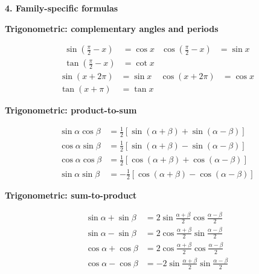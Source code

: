 \documentclass[10pt,a4paper]{article}
\newcommand{\sectionbar}[1]{%
  \needspace{3\baselineskip}
  \vspace{4pt}%
  \colorbox{DeepBlue}{%
    \parbox{\dimexpr\linewidth-2\fboxsep\relax}{%
      \color{white}\bfseries #1}}%
  \vspace{3pt}%
}
\newcommand{\subbar}[1]{%
  \needspace{3\baselineskip}
  \vspace{3pt}%
  {\color{Teal}\bfseries #1}\par
  \vspace{-1pt}{\color{RuleBlue}\rule{\linewidth}{0.45pt}}\vspace{-3pt}%
}
\begin{document}
\newpage
\sectionbar{4. Family-specific formulas}
\noindent
\begin{minipage}[t][0.86\textheight][t]{0.485\linewidth}
\vspace{0pt}

\subbar{Trigonometric: complementary angles and periods}
\[
\begin{aligned}
\sin\!\left(\frac\pi2-x\right)&=\cos x &
\cos\!\left(\frac\pi2-x\right)&=\sin x\\
\tan\!\left(\frac\pi2-x\right)&=\cot x
\end{aligned}
\]
\[
\begin{aligned}
\sin(x+2\pi)&=\sin x & \cos(x+2\pi)&=\cos x\\
\tan(x+\pi)&=\tan x
\end{aligned}
\]

\vfill
\subbar{Trigonometric: product-to-sum}
\footnotesize
\[
\begin{aligned}
\sin\alpha\cos\beta
 &=\tfrac12[\sin(\alpha+\beta)+\sin(\alpha-\beta)]\\
\cos\alpha\sin\beta
 &=\tfrac12[\sin(\alpha+\beta)-\sin(\alpha-\beta)]\\
\cos\alpha\cos\beta
 &=\tfrac12[\cos(\alpha+\beta)+\cos(\alpha-\beta)]\\
\sin\alpha\sin\beta
 &=-\tfrac12[\cos(\alpha+\beta)-\cos(\alpha-\beta)]
\end{aligned}
\]
\normalsize

\vfill
\subbar{Trigonometric: sum-to-product}
\footnotesize
\[
\begin{aligned}
\sin\alpha+\sin\beta
 &=2\sin\frac{\alpha+\beta}{2}\cos\frac{\alpha-\beta}{2}\\
\sin\alpha-\sin\beta
 &=2\cos\frac{\alpha+\beta}{2}\sin\frac{\alpha-\beta}{2}\\
\cos\alpha+\cos\beta
 &=2\cos\frac{\alpha+\beta}{2}\cos\frac{\alpha-\beta}{2}\\
\cos\alpha-\cos\beta
 &=-2\sin\frac{\alpha+\beta}{2}\sin\frac{\alpha-\beta}{2}
\end{aligned}
\]
\normalsize

\end{minipage}\hfill
\end{document}
